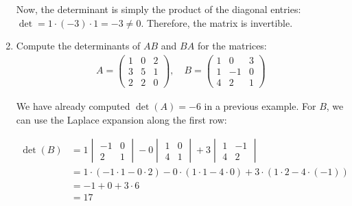 \documentclass{article}
\begin{document}
\begin{enumerate}
          Now, the determinant is simply the product of the diagonal entries: $\det = 1 \cdot (-3) \cdot 1 = -3 \neq 0$. Therefore, the matrix is invertible.

    \item Compute the determinants of $AB$ and $BA$ for the matrices:
          \begin{align*}
              A = \begin{pmatrix}
                      1 & 0 & 2 \\
                      3 & 5 & 1 \\
                      2 & 2 & 0
                  \end{pmatrix}, \quad
              B = \begin{pmatrix}
                      1 & 0  & 3 \\
                      1 & -1 & 0 \\
                      4 & 2  & 1
                  \end{pmatrix}
          \end{align*}

          We have already computed $\det(A) = -6$ in a previous example. For $B$, we can use the Laplace expansion along the first row:

          \begin{align*}
              \det(B) & = 1 \begin{vmatrix}
                                -1 & 0 \\
                                2  & 1
                            \end{vmatrix}
              - 0 \begin{vmatrix}
                      1 & 0 \\
                      4 & 1
                  \end{vmatrix}
              + 3 \begin{vmatrix}
                      1 & -1 \\
                      4 & 2
                  \end{vmatrix}                                                                                                  \\
                      & = 1 \cdot (-1 \cdot 1 - 0 \cdot 2) - 0 \cdot (1 \cdot 1 - 4 \cdot 0) + 3 \cdot (1 \cdot 2 - 4 \cdot (-1)) \\
                      & = -1 + 0 + 3 \cdot 6                                                                                      \\
                      & = 17
          \end{align*}


\end{enumerate}
\end{document}
